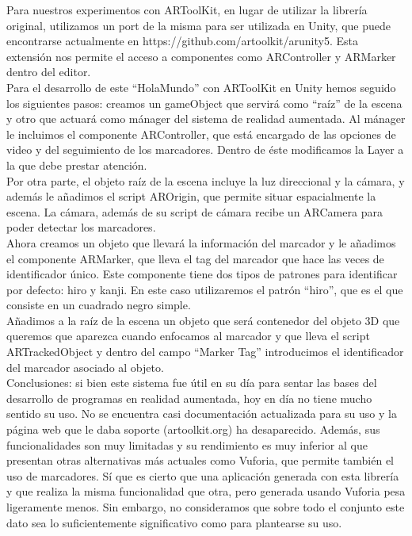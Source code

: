 Para nuestros experimentos con ARToolKit, en lugar de utilizar la librería original, utilizamos un port de la misma para ser utilizada en Unity, que puede encontrarse actualmente en https://github.com/artoolkit/arunity5. Esta extensión nos permite el acceso a componentes como ARController y ARMarker dentro del editor.\\

Para el desarrollo de este “HolaMundo” con ARToolKit en Unity hemos seguido los siguientes pasos: creamos un gameObject  que servirá como “raíz” de la escena y otro que actuará como mánager del sistema de realidad aumentada. Al mánager le incluimos el componente ARController, que está encargado de las opciones de video y del seguimiento de los marcadores. Dentro de éste modificamos la Layer a la que debe prestar atención. \\

Por otra parte, el objeto raíz de la escena incluye la luz direccional y la cámara, y además le añadimos el script AROrigin, que permite situar espacialmente la escena. La cámara, además de su script de cámara recibe un ARCamera para poder detectar los marcadores.\\

Ahora creamos un objeto que llevará la información del marcador y le añadimos el componente ARMarker, que lleva el tag del marcador que hace las veces de identificador único. Este componente tiene dos tipos de patrones para identificar por defecto: hiro y kanji. En este caso utilizaremos el patrón “hiro”, que es el que consiste en un cuadrado negro simple.\\

Añadimos a la raíz de la escena un objeto que será contenedor del objeto 3D que queremos que aparezca cuando enfocamos al marcador y que lleva el script ARTrackedObject y dentro del campo “Marker Tag” introducimos el identificador del marcador asociado al objeto.\\

Conclusiones: si bien este sistema fue útil en su día para sentar las bases del desarrollo de programas en realidad aumentada, hoy en día no tiene mucho sentido su uso. No se encuentra casi documentación actualizada para su uso y la página web que le daba soporte (artoolkit.org) ha desaparecido. Además, sus funcionalidades son muy limitadas y su rendimiento es muy inferior al que presentan otras alternativas más actuales como Vuforia, que permite también el uso de marcadores. Sí que es cierto que una aplicación generada con esta librería y que realiza la misma funcionalidad que otra, pero generada usando Vuforia pesa ligeramente menos. Sin embargo, no consideramos que sobre todo el conjunto este dato sea lo suficientemente significativo como para plantearse su uso.\\
